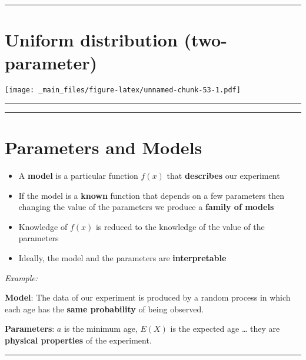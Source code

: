 \documentclass[
]{book}
\begin{document}
\begin{center}\rule{0.5\linewidth}{0.5pt}\end{center}

\hypertarget{uniform-distribution-two-parameter}{%
\section{Uniform distribution (two-parameter)}\label{uniform-distribution-two-parameter}}

\texttt{[image: \_main\_files/figure-latex/unnamed-chunk-53-1.pdf]}

\begin{center}\rule{0.5\linewidth}{0.5pt}\end{center}

\begin{center}\rule{0.5\linewidth}{0.5pt}\end{center}

\hypertarget{parameters-and-models}{%
\section{Parameters and Models}\label{parameters-and-models}}

\begin{itemize}
\item
  A \textbf{model} is a particular function \(f(x)\) that \textbf{describes} our experiment
\item
  If the model is a \textbf{known} function that depends on a few parameters then changing the value of the parameters we produce a \textbf{family of models}
\item
  Knowledge of \(f(x)\) is reduced to the knowledge of the value of the parameters
\item
  Ideally, the model and the parameters are \textbf{interpretable}
\end{itemize}

\emph{Example:}

\textbf{Model}: The data of our experiment is produced by a random process in which each age has the \textbf{same probability} of being observed.

\textbf{Parameters}: \(a\) is the minimum age, \(E(X)\) is the expected age \ldots{} they are \textbf{physical properties} of the experiment.

\begin{center}\rule{0.5\linewidth}{0.5pt}\end{center}
\end{document}
